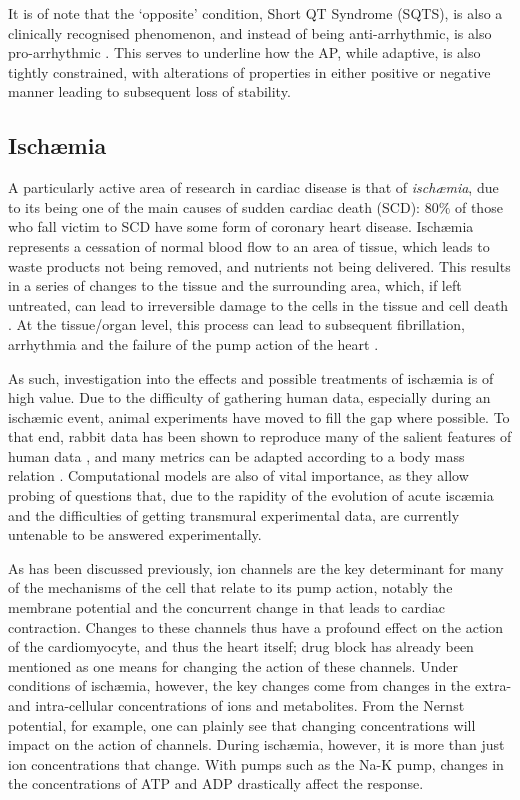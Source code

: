 \documentclass[../thesis-main.tex]{subfiles}
\begin{document}
 It is of note that the `opposite' condition, Short QT Syndrome (SQTS), is also a clinically recognised phenomenon, and instead of being anti-arrhythmic, is also pro-arrhythmic \citep{Adeniran2011}. This serves to underline how the AP, while adaptive, is also tightly constrained, with alterations of properties in either positive or negative manner leading to subsequent loss of stability.
 
 \subsection{Isch\ae{}mia}
 \label{subsec:ischaemia}
 A particularly active area of research in cardiac disease is that of \emph{isch\ae{}mia}, due to its being one of the main causes of sudden cardiac death (SCD): $80\%$ of those who fall victim to SCD have some form of coronary heart disease. Isch\ae{}mia represents a cessation of normal blood flow to an area of tissue, which leads to waste products not being removed, and nutrients not being delivered. This results in a series of changes to the tissue and the surrounding area, which, if left untreated, can lead to irreversible damage to the cells in the tissue and cell death \citep{Carmeliet1999}. At the tissue/organ level, this process can lead to subsequent fibrillation, arrhythmia and the failure of the pump action of the heart \citep{Harris1954}.
 
 As such, investigation into the effects and possible treatments of isch\ae{}mia  is of high value. Due to the difficulty of gathering human data, especially during an isch\ae{}mic event, animal experiments have moved to fill the gap where possible. To that end, rabbit data has been shown to reproduce many of the salient features of human data \citep{Giles1988, Barrett1997, Panfilov2006}, and many metrics can be adapted according to a body mass relation \citep{Noujaim2007}. Computational models are also of vital importance, as they allow probing of questions that, due to the rapidity of the evolution of acute isc\ae mia and the difficulties of getting transmural experimental data, are currently untenable to be answered experimentally.
 
 As has been discussed previously, ion channels are the key determinant for many of the mechanisms of the cell that relate to its pump action, notably the membrane potential and the concurrent change in \cai{} that leads to cardiac contraction. Changes to these channels thus have a profound effect on the action of the cardiomyocyte, and thus the heart itself; drug block has already been mentioned as one means for changing the action of these channels. Under conditions of isch\ae{}mia, however, the key changes come from changes in the extra- and intra-cellular concentrations of ions and metabolites. From the Nernst potential, for example, one can plainly see that changing concentrations will impact on the action of channels. During isch\ae{}mia, however, it is more than just ion concentrations that change. With pumps such as the Na-K pump, changes in the concentrations of ATP and ADP drastically affect the response.
 
\end{document}
